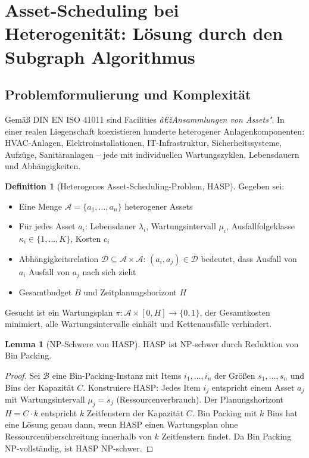 ﻿\documentclass[a4paper,12pt]{article}
\theoremstyle{definition}
\newtheorem{definition}{Definition}[section]
\newtheorem{lemma}{Lemma}[section]
\begin{document}
\section{Asset-Scheduling bei Heterogenität: Lösung durch den Subgraph Algorithmus}
\label{sec:asset}

\subsection{Problemformulierung und Komplexität}

Gemäß DIN EN ISO 41011 sind Facilities \emph{â€žAnsammlungen von Assets"}.
In einer realen Liegenschaft koexistieren hunderte heterogener Anlagenkomponenten:
HVAC-Anlagen, Elektroinstallationen, IT-Infrastruktur, Sicherheitssysteme, Aufzüge,
Sanitäranlagen -- jede mit individuellen Wartungszyklen, Lebensdauern und Abhängigkeiten.

\begin{definition}[Heterogenes Asset-Scheduling-Problem, HASP]
\label{def:hasp}
Gegeben sei:
\begin{itemize}
    \item Eine Menge $\mathcal{A} = \{a_1, \ldots, a_n\}$ heterogener Assets
    \item Für jedes Asset $a_i$: Lebensdauer $\lambda_i$, Wartungsintervall $\mu_i$,
          Ausfallfolgeklasse $\kappa_i \in \{1,\ldots,K\}$, Kosten $c_i$
    \item Abhängigkeitsrelation $\mathcal{D} \subseteq \mathcal{A} \times \mathcal{A}$:
          $(a_i, a_j) \in \mathcal{D}$ bedeutet, dass Ausfall von $a_i$ Ausfall von $a_j$
          nach sich zieht
    \item Gesamtbudget $B$ und Zeitplanungshorizont $H$
\end{itemize}
Gesucht ist ein Wartungsplan $\pi: \mathcal{A} \times [0,H] \to \{0,1\}$,
der Gesamtkosten minimiert, alle Wartungsintervalle einhält und Kettenausfälle verhindert.
\end{definition}

\begin{lemma}[NP-Schwere von HASP]
\label{lem:hasp-np}
HASP ist NP-schwer durch Reduktion von Bin Packing.
\end{lemma}

\begin{proof}
Sei $\mathcal{B}$ eine Bin-Packing-Instanz mit Items $i_1, \ldots, i_n$ der Größen
$s_1, \ldots, s_n$ und Bins der Kapazität $C$.
Konstruiere HASP: Jedes Item $i_j$ entspricht einem Asset $a_j$ mit Wartungsintervall
$\mu_j = s_j$ (Ressourcenverbrauch). Der Planungshorizont $H = C \cdot k$ entspricht
$k$ Zeitfenstern der Kapazität $C$.
Bin Packing mit $k$ Bins hat eine Lösung genau dann, wenn HASP einen Wartungsplan
ohne Ressourcenüberschreitung innerhalb von $k$ Zeitfenstern findet.
Da Bin Packing NP-vollständig, ist HASP NP-schwer.
\end{proof}
\end{document}

